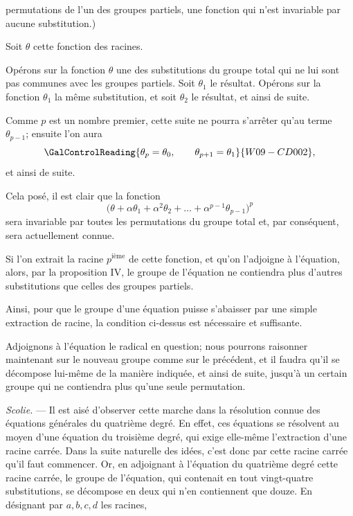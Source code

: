 
permutations de l'un des groupes partiels, une fonction qui n'est
invariable par aucune substitution.)

Soit $\theta$ cette fonction des racines.

Opérons sur la fonction $\theta$ une des substitutions du groupe total
qui ne lui sont pas communes avec les groupes partiels. Soit $\theta_{1}$ le
résultat. Opérons sur la fonction $\theta_{1}$ la même substitution, et
soit $\theta_{2}$ le résultat, et ainsi de suite.

Comme $p$ est un nombre premier, cette suite ne pourra s'arrêter
qu'au terme $\theta_{p-1}$; ensuite l'on aura
\[
\GalControlReading{\theta_{p}=\theta_{0},\qquad \theta_{p+1}=\theta_{1}}{W09-CD002},
\]
et ainsi de suite.

Cela posé, il est clair que la fonction
\[
\bigl(\theta+\alpha\theta_{1}
        +\alpha^{2}\theta_{2}+\ldots
        +\alpha^{p-1}\theta_{p-1}\bigr)^{p}
\]
sera invariable par toutes les permutations du groupe total et, par
conséquent, sera actuellement connue.

Si l'on extrait la racine $p^{\text{ième}}$ de cette fonction, et qu'on l'adjoigne
à l'équation, alors, par la proposition IV, le groupe de
l'équation ne contiendra plus d'autres substitutions que celles des
groupes partiels.

Ainsi, pour que le groupe d'une équation puisse s'abaisser par
une simple extraction de racine, la condition ci-dessus est nécessaire
et suffisante.

Adjoignons à l'équation le radical en question; nous pourrons
raisonner maintenant sur le nouveau groupe comme sur le précédent,
et il faudra qu'il se décompose lui-même de la manière
indiquée, et ainsi de suite, jusqu'à un certain groupe qui ne contiendra
plus qu'une seule permutation.

\emph{Scolie.} --- Il est aisé d'observer cette marche dans la résolution
connue des équations générales du quatrième degré. En effet, ces
équations se résolvent au moyen d'une équation du troisième
degré, qui exige elle-même l'extraction d'une racine carrée. Dans
la suite naturelle des idées, c'est donc par cette racine carrée
qu'il faut commencer. Or, en adjoignant à l'équation du quatrième
degré cette racine carrée, le groupe de l'équation, qui contenait
en tout vingt-quatre substitutions, se décompose en deux qui n'en
contiennent que douze. En désignant par $a,b,c,d$ les racines,
